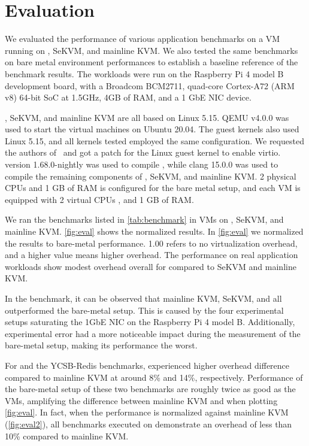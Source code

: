 \chapter{Evaluation}
\label{sec:eval}

We evaluated the performance of various application benchmarks
on a VM running on \rustsec{}, SeKVM, and mainline KVM.
We also tested the same
benchmarks on bare metal environment performances to establish a baseline
reference of the benchmark results. The workloads were run on the Raspberry
Pi 4 model B development board, with a Broadcom BCM2711, quad-core
Cortex-A72 (ARM v8) 64-bit SoC at 1.5GHz, 4GB of RAM, and a 1 GbE NIC device.

\rustsec{}, SeKVM, and mainline KVM are all based on Linux 5.15.
QEMU v4.0.0 was used to start the virtual machines on Ubuntu 20.04. The guest
kernels also used Linux 5.15, and all kernels tested employed the same 
configuration. We requested the authors of~\cite{hypsec} and got a patch for
the Linux guest kernel to enable virtio.
 version 1.68.0-nightly was used to compile \rustcore{},
while clang 15.0.0 was used to compile the remaining components of
\rustsec{}, SeKVM, and mainline KVM.
2 physical CPUs and 1 GB of RAM is configured for the bare
metal setup, and each VM is equipped with 2 virtual CPUs , and 1 GB of RAM.

We ran the benchmarks listed in \autoref{tab:benchmark} in VMs on
\rustsec{}, SeKVM, and mainline KVM. \autoref{fig:eval} shows the normalized
results. In \autoref{fig:eval} we normalized the results to bare-metal
performance. 1.00 refers to no virtualization overhead, and
a higher value means higher overhead. The performance on real application
workloads show modest overhead overall for \rustsec{} compared to SeKVM and
mainline KVM.

In the  benchmark, it can be observed that mainline KVM,
SeKVM, and \rustsec{} all outperformed the bare-metal setup. This is caused by
the four experimental setups saturating the 1GbE NIC on the Raspberry Pi 4
model B. Additionally, experimental error had a more noticeable impact during
the measurement of the bare-metal setup, making its performance the worst.

For  and the YCSB-Redis benchmarks, \rustsec{} experienced higher
overhead difference compared to mainline KVM at around 8\% and 14\%,
respectively.
Performance of the bare-metal setup of these two benchmarks
are roughly twice as good as the VMs, amplifying the difference between mainline
KVM and \rustsec{} when plotting \autoref{fig:eval}.
In fact, when the performance is normalized against
mainline KVM (\autoref{fig:eval2}), all benchmarks executed on \rustsec{}
demonstrate an overhead of less than 10\% compared to mainline KVM.

